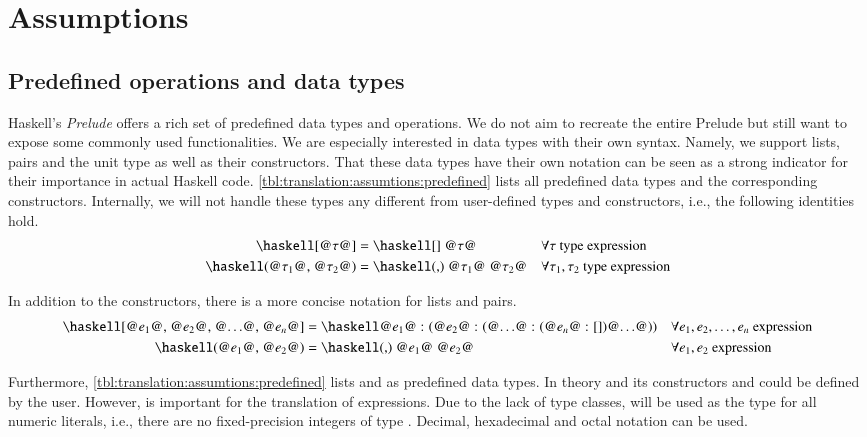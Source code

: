 \section{Assumptions} \label{sec:translation:assumtions}
\subsection{Predefined operations and data types}
Haskell's \textit{Prelude} offers a rich set of predefined data types and operations.
We do not aim to recreate the entire Prelude but still want to expose some commonly used functionalities.
We are especially interested in data types with their own syntax.
Namely, we support lists, pairs and the unit type as well as their constructors.
That these data types have their own notation can be seen as a strong indicator for their importance in actual Haskell code.
\autoref{tbl:translation:assumtions:predefined} lists all predefined data types and the corresponding constructors.
Internally, we will not handle these types any different from user-defined types and constructors, i.e., the following identities hold.
\begin{align*}
  \haskellM{[@$\tau$@]}
  &= \haskellM{[] @$\tau$@}
  &&\forall \tau \text{ type expression}
  \\
  \haskellM{(@$\tau_1$@, @$\tau_2$@)}
  &= \haskellM{(,) @$\tau_1$@ @$\tau_2$@}
  &&\forall \tau_1, \tau_2 \text{ type expression}
\end{align*}

In addition to the constructors, there is a more concise notation for lists and pairs.
\begin{align}
  \haskellM{[@$e_1$@, @$e_2$@, @$\ldots$@, @$e_n$@]}
  &= \haskellM{@$e_1$@ : (@$e_2$@ : (@$\ldots$@ : (@$e_n$@ : [])@$\ldots$@))}
  &&\forall e_1, e_2, \ldots, e_n \text{ expression}
  \label{eqn:translation:assumtions:list-literal}
  \\
  \haskellM{(@$e_1$@, @$e_2$@)}
  &= \haskellM{(,) @$e_1$@ @$e_2$@}
  &&\forall e_1, e_2 \text{ expression}
  \label{eqn:translation:assumtions:pair-literal}
\end{align}

Furthermore, \autoref{tbl:translation:assumtions:predefined} lists  and  as predefined data types.
In theory  and its constructors  and  could be defined by the user.
However,  is important for the translation of  expressions.
Due to the lack of type classes,  will be used as the type for all numeric literals, i.e., there are no fixed-precision integers of type .
Decimal, hexadecimal and octal notation can be used.


